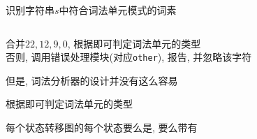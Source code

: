 \begin{frame}{}
  \begin{center}
    识别字符串$s$中符合词法单元模式的词素
  \end{center}

  \begin{columns}
      \begin{center}
      \end{center}
      \begin{center}
      \end{center}
  \end{columns}

  \pause
  \vspace{0.30cm}
  \begin{center}
     合并$22, 12, 9, 0$, 根据即可判定词法单元的类型 \\[8pt]
    否则, 调用错误处理模块(对应\texttt{other}), 报告, 并忽略该字符
  \end{center}
\end{frame}

\begin{frame}{}
  \begin{center}
    但是, 词法分析器的设计并没有这么容易

    \vspace{0.50cm}
  \end{center}
\end{frame}

\begin{frame}{}
  \begin{center}
    \ws \quad \ifkw \quad \elsekw \quad \id \quad \intnum \quad \relop

    \vspace{0.80cm}
    根据即可判定词法单元的类型

    \vspace{0.50cm}
    每个状态转移图的每个状态要么是, 要么带有 

    \pause
    \vspace{1.20cm}
  \end{center}
\end{frame}


